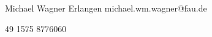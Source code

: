 \documentclass[grey]{hipstercv}
\newlength{\rightcolwidth}
\begin{document}
\begin{paracol}{2}
\vfill{} %
\setlength{\parindent}{0pt}
\begin{minipage}[t]{\rightcolwidth}
\begin{center}\fontfamily{\sfdefault}\selectfont \color{black!70}
{
\small Michael Wagner 
 Erlangen 
 michael.wm.wagner@fau.de\newline 

 49 1575 8776060 %
}
\end{center}
\end{minipage}


\end{paracol}
\end{document}
